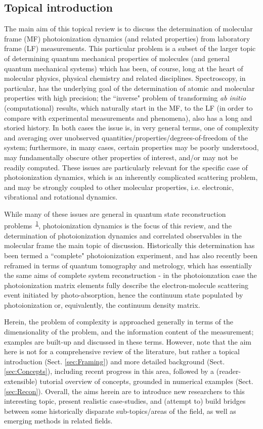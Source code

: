 \documentclass[10pt]{article}
\begin{document}
\subsection{Topical introduction}
The main aim of this topical review is to discuss the determination of molecular frame (MF) photoionization dynamics (and related properties) from laboratory frame (LF) measurements. This particular problem is a subset of the larger topic of determining quantum mechanical properties of molecules (and general quantum mechanical systems) which has been, of course, long at the heart of molecular physics, physical chemistry and related disciplines. Spectroscopy, in particular, has the underlying goal of the determination of atomic and molecular properties with high precision; the ``inverse" problem of transforming \textit{ab initio} (computational) results, which naturally start in the MF, to the LF (in order to compare with experimental measurements and phenomena), also has a long and storied history. In both cases the issue is, in very general terms, one of complexity and averaging over unobserved quantities/properties/degrees-of-freedom of the system; furthermore, in many cases, certain properties may be poorly understood, may fundamentally obscure other properties of interest, and/or may not be readily computed. These issues are particularly relevant for the specific case of photoionization dynamics, which is an inherently complicated scattering problem, and may be strongly coupled to other molecular properties, i.e. electronic, vibrational and rotational dynamics. 

While many of these issues are general in quantum state reconstruction problems~\textsuperscript{\hyperref[csl:1]{1}}, photoionization dynamics is the focus of this review, and the determination of photoionization dynamics and correlated observables in the molecular frame the main topic of discussion. Historically this determination has been termed a ``complete" photoionization experiment, and has also recently been reframed in terms of quantum tomography and metrology, which has essentially the same aims of complete system reconstruction - in the photoionzation case the photoionization matrix elements fully describe the electron-molecule scattering event initiated by photo-absorption, hence the continuum state populated by photoionization or, equivalently, the continuum density matrix.

Herein, the problem of complexity is approached generally in terms of the dimensionality of the problem, and the information content of the measurement; examples are built-up and discussed in these terms. However, note that the aim here is not for a comprehensive review of the literature, but rather a topical introduction (Sect. \ref{sec:Framing}) and more detailed background (Sect. \ref{sec:Concepts}), including recent progress in this area, followed by a (reader-extensible) tutorial overview of concepts, grounded in numerical examples (Sect. \ref{sec:Recon}). Overall, the aims herein are to introduce new researchers to this interesting topic, present realistic case-studies, and (attempt to) build bridges between some historically disparate sub-topics/areas of the field, as well as emerging methods in related fields.
\end{document}
